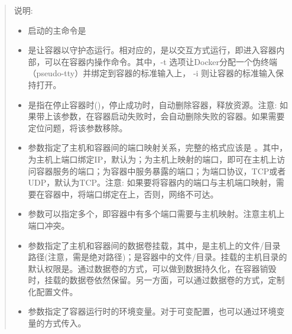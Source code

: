 \documentclass[letterpaper,10pt,english]{sphinxmanual}
\begin{document}
\begin{quote}

说明:
\begin{itemize}
\item {} 
启动的主命令是 

\item {} 
是让容器以守护态运行。相对应的，是以交互方式运行，即进入容器内部，可以在容器内操作命令。其中，-t 选项让Docker分配一个伪终端（pseudo-tty）并绑定到容器的标准输入上， -i 则让容器的标准输入保持打开。

\item {} 
 是指在停止容器时()，停止成功时，自动删除容器，释放资源。注意: 如果带上该参数，在容器启动失败时，会自动删除失败的容器。如果需要定位问题，将该参数移除。

\item {} 
 参数指定了主机和容器间的端口映射关系，完整的格式应该是 。其中，为主机上端口绑定IP，默认为；为主机上映射的端口，即可在主机上访问容器服务的端口；为容器中服务暴露的端口；为端口协议，TCP或者UDP，默认为TCP。注意: 如果要将容器内的端口与主机端口映射，需要在容器中，将端口绑定在上，否则，网络不可达。

\item {} 
参数可以指定多个，即容器中有多个端口需要与主机映射。注意主机上端口冲突。

\item {} 
参数指定了主机和容器间的数据卷挂载，其中，是主机上的文件/目录路径(注意，需是绝对路径)；是容器中的文件/目录。挂载的主机目录的默认权限是。通过数据卷的方式，可以做到数据持久化，在容器销毁时，挂载的数据卷依然保留。另一方面，可以通过数据卷的方式，定制化配置文件。

\item {} 
参数指定了容器运行时的环境变量。对于可变配置，也可以通过环境变量的方式传入。


\end{itemize}
\end{quote}
\end{document}
